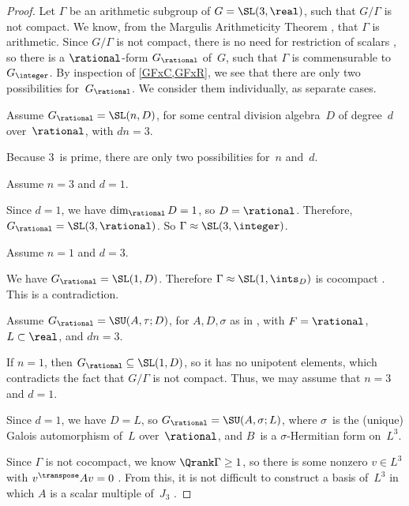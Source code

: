  \begin{proof}
 Let $\Gamma$ be an arithmetic subgroup of $G = \SL(3,\real)$, such that
$G/\Gamma$ is not compact. We
know, from the Margulis Arithmeticity Theorem
, that $\Gamma$ is arithmetic. Since
$G/\Gamma$ is not compact, there is no need for restriction of scalars , so there is a $\rational$-form $G_\rational$ of~$G$, such that $\Gamma$ is commensurable to~$G_\integer$.
By inspection of \cref{GFxC,GFxR}, we see that there are only two
possibilities for~$G_{\rational}$. We consider them individually, as separate cases.


\setcounter{case}{0}

\begin{case}
 Assume $G_{\rational} = \SL(n,D)$, for some central
division algebra~$D$ of degree~$d$ over~$\rational$, with
$dn = 3$.
 \end{case}
 Because $3$~is prime, there are only two possibilities
for~$n$ and~$d$.

\begin{subcase}
 Assume $n = 3$ and $d = 1$.
 \end{subcase}
 Since $d = 1$, we have $\dim_{\rational} D = 1$, so $D =
\rational$. Therefore, $G_{\rational} = \SL(3,\rational)$.
So $\Gamma \approx \SL(3,\integer)$.

\goodbreak

\begin{subcase} \label{AllNoncocptSL3RPf-SL1D}
 Assume $n = 1$ and $d = 3$.
 \end{subcase}
 We have $G_{\rational} = \SL(1,D)$. Therefore $\Gamma \approx
\SL(1,\ints_D)$ is cocompact
. This is a contradiction.

\begin{case}
 Assume $G_{\rational} = \SU(A,\tau;D)$, for $A,D,\sigma$
as in , with $F =
\rational$, $L \subset \real$, and $dn = 3$.
 \end{case}
 If $n = 1$, then $G_{\rational} \subseteq \SL(1,D)$, so it has no unipotent elements, which contradicts the fact that $G/\Gamma$ is not compact. Thus, we may
assume that $n = 3$ and $d = 1$. 

Since $d = 1$, we have $D = L$, so $G_{\rational} =
\SU(A,\sigma;L)$, where $\sigma$~is the (unique) Galois
automorphism of~$L$ over~$\rational$, and $B$~is a
$\sigma$-Hermitian form on~$L^3$.

Since $\Gamma$ is not cocompact, we know $\Qrank \Gamma \ge 1$, so there is some nonzero $v \in L^3$ with $v^\transpose A v = 0$ . From this, it is not difficult to construct a basis of~$L^3$ in which $A$ is a scalar multiple of~$J_3$ . 
 \end{proof}
 
